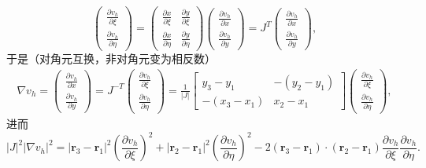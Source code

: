 \documentclass[a4paper,10pt]{ctexart}
\begin{document}
\begin{equation}
    \begin{pmatrix} 
        \frac{\partial v_h}{\partial \xi}  \\ \frac{\partial v_h}{\partial \eta} 
    \end{pmatrix} = 
    \begin{pmatrix} 
        \frac{\partial x}{\partial \xi} & \frac{\partial y}{\partial \xi} \\
        \frac{\partial x}{\partial \eta} & \frac{\partial y}{\partial \eta}
    \end{pmatrix}
    \begin{pmatrix} 
        \frac{\partial v_h}{\partial x}  \\ \frac{\partial v_h}{\partial y}
    \end{pmatrix} = J^T 
    \begin{pmatrix} 
        \frac{\partial v_h}{\partial x}  \\ \frac{\partial v_h}{\partial y}
    \end{pmatrix},
\end{equation}
于是（对角元互换，非对角元变为相反数）
\begin{equation}
    \begin{aligned}
        \nabla v_h = \begin{pmatrix} \frac{\partial v_h}{\partial x} \\ \frac{\partial v_h}{\partial y} \end{pmatrix} = J^{-T} \begin{pmatrix} \frac{\partial v_h}{\partial \xi} \\ \frac{\partial v_h}{\partial \eta} \end{pmatrix} 
        = \frac{1}{|J|}
        \begin{bmatrix} 
            y_3-y_1 & -(y_2-y_1)\\
            -(x_3-x_1) & x_2-x_1     
        \end{bmatrix} 
        \begin{pmatrix} 
            \frac{\partial v_h}{\partial \xi} \\ \frac{\partial v_h}{\partial \eta}
        \end{pmatrix},
    \end{aligned}
\end{equation}
进而
\begin{equation}
    |J|^2 |\nabla v_h|^2 = |\bm{r}_3-\bm{r}_1|^2 \left( \dfrac{\partial v_h}{\partial \xi} \right)^2 + |\bm{r}_2-\bm{r}_1|^2 \left( \dfrac{\partial v_h}{\partial \eta} \right)^2 - 2(\bm{r}_3-\bm{r}_1)\cdot (\bm{r}_2-\bm{r}_1)\dfrac{\partial v_h}{\partial \xi}\dfrac{\partial v_h}{\partial \eta}.
\end{equation}
\end{document}
